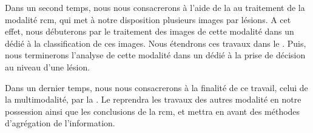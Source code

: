 Dans un second temps, nous nous consacrerons à l'aide de la  au traitement de la modalité \acrfull{rcm}, qui met à notre disposition plusieurs images par lésions. A cet effet, nous débuterons par le traitement des images de cette modalité dans un  dédié à la classification de ces images. Nous étendrons ces travaux dans le . Puis, nous terminerons l'analyse de cette modalité dans un  dédié à la prise de décision au niveau d'une lésion.\par

Dans un dernier temps, nous nous consacrerons à la finalité de ce travail, celui de la multimodalité, par la . Le  reprendra les travaux des autres modalité en notre possession ainsi que les conclusions de la \gls{rcm}, et mettra en avant des méthodes d'agrégation de l'information.\par
